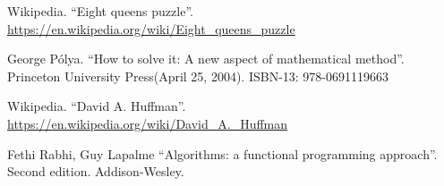 \documentclass[b5paper]{ctexart}
\begin{document}
\begin{thebibliography}{99}
Wikipedia. ``Eight queens puzzle''. \url{https://en.wikipedia.org/wiki/Eight_queens_puzzle}

George P\'{o}lya. ``How to solve it: A new aspect of mathematical method''. Princeton University Press(April 25, 2004). ISBN-13: 978-0691119663

Wikipedia. ``David A. Huffman''. \url{https://en.wikipedia.org/wiki/David_A._Huffman}

Fethi Rabhi, Guy Lapalme ``Algorithms: a functional programming approach''. Second edition. Addison-Wesley.

\end{thebibliography}

\expandafter\enddocument
\fi
\end{document}
